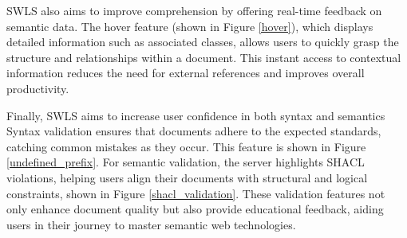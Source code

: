 SWLS also aims to improve comprehension by offering real-time feedback on semantic data.
The hover feature (shown in Figure \ref{hover}), which displays detailed information such as associated classes, allows users to quickly grasp the structure and relationships within a document. 
This instant access to contextual information reduces the need for external references and improves overall productivity.

Finally, SWLS aims to increase user confidence in both syntax and semantics
Syntax validation ensures that documents adhere to the expected standards, catching common mistakes as they occur. This feature is shown in Figure \ref{undefined_prefix}.
For semantic validation, the server highlights SHACL violations, helping users align their documents with structural and logical constraints, shown in Figure \ref{shacl_validation}. 
These validation features not only enhance document quality but also provide educational feedback, aiding users in their journey to master semantic web technologies.


